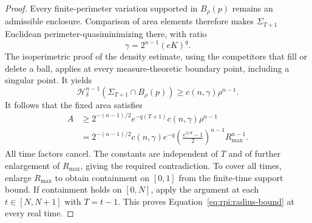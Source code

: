\begin{proof}
Every finite-perimeter variation supported in $B_\rho(p)$ remains an
admissible enclosure. Comparison of area elements therefore makes
$\Sigma_{T+1}$ Euclidean perimeter-quasiminimizing there, with ratio
\[
 \gamma=2^{n-1}(eK)^q.
\]
The isoperimetric proof of the density estimate, using the competitors
that fill or delete a ball, applies at every measure-theoretic boundary
point, including a singular point. It yields
\[
 \mathcal H_\delta^{n-1}(\Sigma_{T+1}\cap B_\rho(p))
 \geq c(n,\gamma)\rho^{n-1}.
\]
It follows that the fixed area satisfies
\[
 \begin{split}
 A&\geq 2^{-(n-1)/2}e^{-q(T+1)}
       c(n,\gamma)\rho^{n-1}\\
  &=2^{-(n-1)/2}c(n,\gamma)e^{-q}
       \left(\frac{e^{2/d}-1}{2}\right)^{n-1}R_{\max}^{n-1}.
 \end{split}
\]
All time factors cancel. The constants are independent of $T$ and of
further enlargement of $R_{\max}$, giving the required contradiction.
To cover all times, enlarge $R_{\max}$ to obtain containment on $[0,1]$
from the finite-time support bound. If containment holds on
$[0,N]$, apply the argument at each $t\in[N,N+1]$ with $T=t-1$.
This proves Equation~\eqref{eq:rpi:radius-bound} at every real time.
\end{proof}
